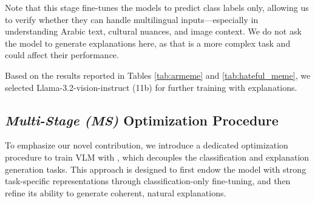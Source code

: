 Note that this stage fine-tunes the models to predict class labels only, allowing us to verify whether they can handle multilingual inputs—especially in understanding Arabic text, cultural nuances, and image context. We do not ask the model to generate explanations here, as that is a more complex task and could affect their performance.


Based on the results reported in Tables \ref{tab:armeme} and \ref{tab:hateful_meme}, we selected Llama-3.2-vision-instruct (11b) for further training with explanations.




\subsection{\textit{Multi-Stage (MS)} Optimization Procedure} \label{sec:multi-stage}
%
To emphasize our novel contribution, we introduce a dedicated optimization procedure to train VLM with \memex{}, which decouples the classification and explanation generation tasks. This approach is designed to first endow the model with strong task-specific representations through classification-only fine-tuning, and then refine its ability to generate coherent, natural explanations.

